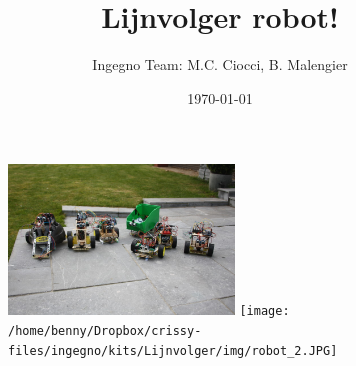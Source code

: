 \documentclass[8pt,a5paper]{article}
\newcommand{\nedt}[1]{{#1}}
\newcommand{\engt}[1]{ }
\begin{document}
 \title{Lijnvolger robot!}
 \author{Ingegno Team: M.C. Ciocci, B. Malengier}
 \date{\today}
 \maketitle

\begin{figure}[h]
  \centering
  \includegraphics[width=6cm]{pic/robotteam.jpg}
  \texttt{[image: /home/benny/Dropbox/crissy-files/ingegno/kits/Lijnvolger/img/robot\_2.JPG]}
\label{f:ingrobots}       %
\end{figure}

\begin{Parallel}{7.5cm}{7.5cm}



\end{Parallel}
\end{document}
